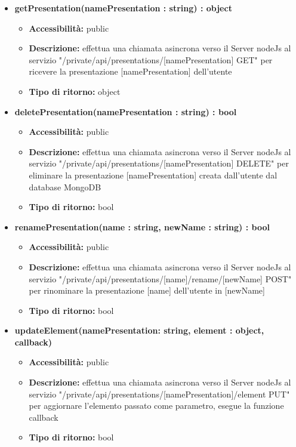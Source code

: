 {\begin{itemize}
		\item \textbf{getPresentation(namePresentation : string) : object}
			\begin{itemize}
			\item \textbf{Accessibilit\`{a}:} public
			\item \textbf{Descrizione:} effettua una chiamata asincrona verso il Server nodeJs al servizio "/private/api/presentations/[namePresentation] GET" per ricevere la presentazione [namePresentation] dell'utente
			\item \textbf{Tipo di ritorno:} object
			\end{itemize}
			
		\item \textbf{deletePresentation(namePresentation : string) : bool}
			\begin{itemize}
			\item \textbf{Accessibilit\`{a}:} public
			\item \textbf{Descrizione:} effettua una chiamata asincrona verso il Server nodeJs al servizio "/private/api/presentations/[namePresentation] DELETE" per eliminare la presentazione [namePresentation] creata dall'utente dal database MongoDB
			\item \textbf{Tipo di ritorno:} bool
			\end{itemize}
			
		\item \textbf{renamePresentation(name : string, newName : string) : bool}
			\begin{itemize}
			\item \textbf{Accessibilit\`{a}:} public
			\item \textbf{Descrizione:} effettua una chiamata asincrona verso il Server nodeJs al servizio "/private/api/presentations/[name]/rename/[newName] POST" per rinominare la presentazione [name] dell'utente in [newName] 
			\item \textbf{Tipo di ritorno:} bool
			\end{itemize}
			
		\item \textbf{updateElement(namePresentation: string, element : object, callback) }
			\begin{itemize}
			\item \textbf{Accessibilit\`{a}:} public
			\item \textbf{Descrizione:} effettua una chiamata asincrona verso il Server nodeJs al servizio "/private/api/presentations/[namePresentation]/element PUT" per aggiornare l'elemento passato come parametro, esegue la funzione callback
			\item \textbf{Tipo di ritorno:} bool
			\end{itemize}
			

\end{itemize}}
